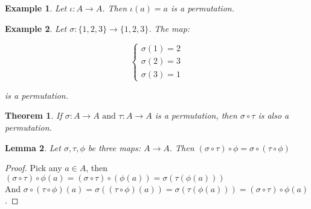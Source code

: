 \documentclass{article}
\theoremstyle{MyNonumberplain}
\theoremstyle{break}
\newtheorem*{proof}{Proof. }
\newcommand{\infixand}{\text{ and }}
\theoremstyle{break}
\newtheorem{theorem}{Theorem}[section]
\newtheorem{example}{Example}[section]
\newtheorem{lemma}[theorem]{Lemma}
\theoremstyle{break}
\theoremstyle{definition}
\theoremstyle{break}
\begin{document}
\begin{expbox}
    \begin{example}
        Let $\iota : A\to A$. Then $\iota(a)=a$ is a permutation.
    \end{example}
\end{expbox}

\begin{expbox}
    \begin{example}
        Let $\sigma:\{1,2,3\}\to\{1,2,3\}$. The map:

        $$\left\{\begin{array}{l}
            \sigma (1) = 2\\
            \sigma (2) = 3\\
            \sigma (3) = 1
          \end{array}\right.$$
        
          is a permutation.
    \end{example}
\end{expbox}

\begin{thmbox}
    \begin{theorem}
        If $\sigma : A \to A \infixand \tau : A \to A$ is a permutation, then $\sigma \circ \tau$ is also a permutation.
    \end{theorem}
\end{thmbox}

\begin{thmbox}
    \begin{lemma}
        Let $\sigma, \tau, \phi$ be three maps: $A \rightarrow A$. Then $(\sigma \circ \tau) \circ \phi = \sigma \circ (\tau \circ \phi)$    
    \end{lemma}
    \begin{prfbox}
        \begin{proof}
            Pick any $a \in A$, then $(\sigma \circ \tau) \circ \phi (a) = (\sigma \circ \tau)
            \circ (\phi (a)) = \sigma (\tau (\phi (a)))$\\

            And $\sigma \circ (\tau \circ \phi) (a) = \sigma ((\tau \circ \phi) (a)) =
            \sigma (\tau (\phi (a))) = (\sigma \circ \tau) \circ \phi (a)$.
        \end{proof}
    \end{prfbox}
\end{thmbox}
\end{document}
